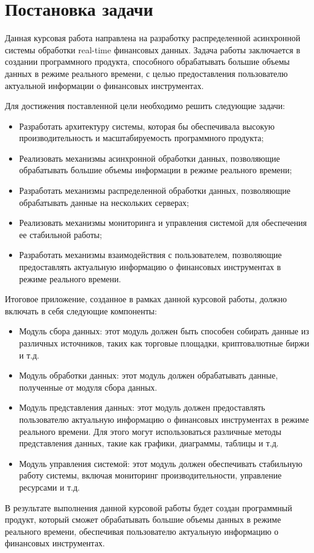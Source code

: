 \section{Постановка задачи}

Данная курсовая работа направлена на разработку распределенной асинхронной системы обработки real-time финансовых данных. Задача работы заключается в создании программного продукта, способного обрабатывать большие объемы данных в режиме реального времени, с целью предоставления пользователю актуальной информации о финансовых инструментах.

Для достижения поставленной цели необходимо решить следующие задачи:
\begin{itemize}
    \item  Разработать архитектуру системы, которая бы обеспечивала высокую производительность и масштабируемость программного продукта;
    \item  Реализовать механизмы асинхронной обработки данных, позволяющие обрабатывать большие объемы информации в режиме реального времени;
    \item  Разработать механизмы распределенной обработки данных, позволяющие обрабатывать данные на нескольких серверах;
    \item  Реализовать механизмы мониторинга и управления системой для обеспечения ее стабильной работы;
    \item  Разработать механизмы взаимодействия с пользователем, позволяющие предоставлять актуальную информацию о финансовых инструментах в режиме реального времени.
\end{itemize}

Итоговое приложение, созданное в рамках данной курсовой работы, должно включать в себя следующие компоненты:

\begin{itemize}
    \item Модуль сбора данных: этот модуль должен быть способен собирать данные из различных источников, таких как торговые площадки, криптовалютные биржи и т.д.
    \item Модуль обработки данных: этот модуль должен обрабатывать данные, полученные от модуля сбора данных.
    \item Модуль представления данных: этот модуль должен предоставлять пользователю актуальную информацию о финансовых инструментах в режиме реального времени.
          Для этого могут использоваться различные методы представления данных, такие как графики, диаграммы, таблицы и т.д.
    \item Модуль управления системой: этот модуль должен обеспечивать стабильную работу системы, включая мониторинг производительности, управление ресурсами и т.д.
\end{itemize}

В результате выполнения данной курсовой работы будет создан программный продукт, который сможет обрабатывать большие объемы данных в режиме реального времени, обеспечивая пользователю актуальную информацию о финансовых инструментах.
